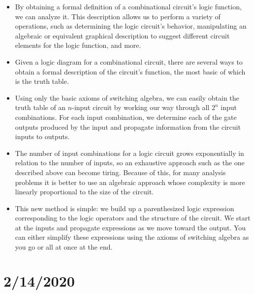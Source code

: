 \documentclass[10pt,a4paper]{article}
\begin{document}
\begin{itemize}
\item By obtaining a formal definition of a combinational circuit's logic function, we can analyze it. This description allows us to perform a variety of operations, such as determining the logic circuit's behavior, manipulating an algebraic or equivalent graphical description to suggest different circuit elements for the logic function, and more. 
\item Given a logic diagram for a combinational circuit, there are several ways to obtain a formal description of the circuit's function, the most basic of which is the truth table.
\item Using only the basic axioms of switching algebra, we can easily obtain the truth table of an $n$-input circuit by working our way through all $2^n$ input combinations. For each input combination, we determine each of the gate outputs produced by the input and propagate information from the circuit inputs to outputs. 
\item The number of input combinations for a logic circuit grows exponentially in relation to the number of inputs, so an exhaustive approach such as the one described above can become tiring. Because of this, for many analysis problems it is better to use an algebraic approach whose complexity is more linearly proportional to the size of the circuit.
\item This new method is simple: we build up a parenthesized logic expression corresponding to the logic operators and the structure of the circuit. We start at the inputs and propagate expressions as we move toward the output. You can either simplify these expressions using the axioms of switching algebra as you go or all at once at the end. 
\end{itemize}\pagebreak
\section{2/14/2020}
\end{document}
